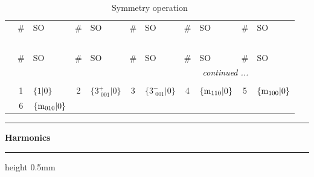 \documentclass[fleqn,10pt,landscape]{jsarticle}
\begin{document}
\renewcommand{\arraystretch}{1.6}
\begin{longtable}[l]{c|cl|cl|cl|cl|cl}
\captionsetup{justification=raggedright, singlelinecheck=off}
\caption{Symmetry operation}
 \\
 \hline \hline
 & \# & SO & \# & SO & \# & SO & \# & SO & \# & SO \\ \hline \endfirsthead

\multicolumn{10}{l}{\tablename\ \thetable{}} \\
 \hline \hline
 & \# & SO & \# & SO & \# & SO & \# & SO & \# & SO \\ \hline \endhead

 \hline \hline
\multicolumn{10}{r}{\footnotesize\it continued ...} \\ \endfoot

 \hline \hline
\multicolumn{10}{r}{} \\ \endlastfoot

 & 1 & $\{1|0\}$ & 2 & $\{3^{+}_{\,\,001}|0\}$ & 3 & $\{3^{-}_{\,\,001}|0\}$ & 4 & $\{{\rm m}_{110}|0\}$ & 5 & $\{{\rm m}_{100}|0\}$ \\
& 6 & $\{{\rm m}_{010}|0\}$ &  &  &  &  &  &  &  &  \\
\end{longtable}
\vspace{5mm}
\noindent \rule[0.5mm]{5mm}{0.5mm}\hspace{3mm}\textbf{Harmonics}\hspace{3mm}\leaders\hrule height 0.5mm\hfill\kern0pt
\vspace{3mm}
\end{document}
